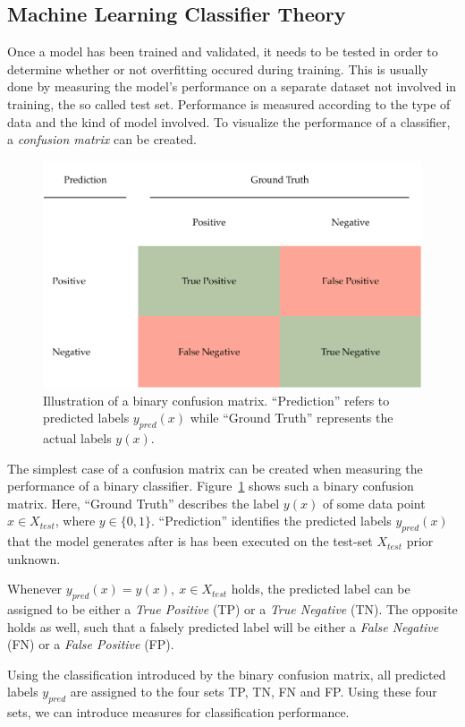 \subsection{Machine Learning Classifier Theory}
Once a model has been trained and validated, it needs to be tested in order to determine whether or not overfitting occured during training.
This is usually done by measuring the model's performance on a separate dataset not involved in training, the so called test set.
Performance is measured according to the type of data and the kind of model involved.
To visualize the performance of a classifier, a \emph{confusion matrix} can be created.
\begin{figure}[ht]
     \centering
     \includegraphics[width=.8\textwidth]{images/binary-confusion-matrix.pdf}
     \caption{Illustration of a binary confusion matrix.
     ``Prediction'' refers to predicted labels \(y_{pred}(x)\) while ``Ground Truth'' represents the actual labels \(y(x)\).}
     \label{fig:confusion-matrix}
 \end{figure}

The simplest case of a confusion matrix can be created when measuring the performance of a binary classifier.
Figure~\ref{fig:confusion-matrix} shows such a binary confusion matrix.
Here, ``Ground Truth'' describes the label \(y(x)\) of some data point \(x \in X_{test}\), where \(y \in \{0, 1\}\).
``Prediction'' identifies the predicted labels \(y_{pred}(x)\) that the model generates after is has been executed on the test-set \(X_{test}\) prior unknown.

Whenever \(y_{pred}(x) = y(x),~x \in X_{test}\) holds, the predicted label can be assigned to be either a \emph{True Positive} (TP) or a \emph{True Negative} (TN).
The opposite holds as well, such that a falsely predicted label will be either a \emph{False Negative} (FN) or a \emph{False Positive} (FP).

Using the classification introduced by the binary confusion matrix, all predicted labels \(y_{pred}\) are assigned to the four sets TP, TN, FN and FP.
Using these four sets, we can introduce measures for classification performance.

